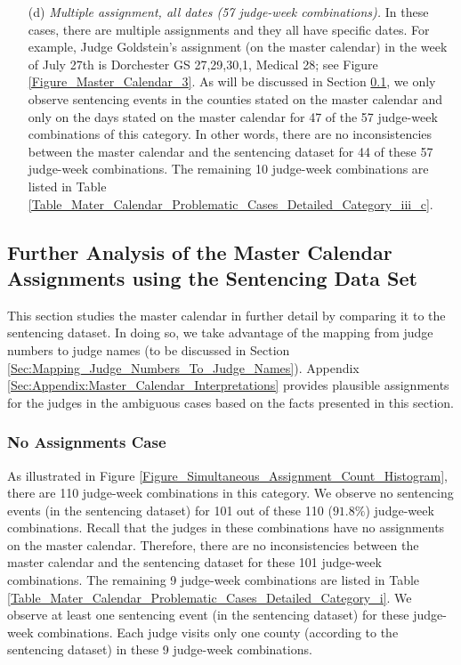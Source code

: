 \documentclass[11pt, oneside]{article}   	%
\theoremstyle{ModifiedStyle}
\begin{document}
\begin{itemize}
				\item[(d)] \emph{Multiple assignment, all dates (57 judge-week combinations).} In these cases, there are multiple assignments and they all have specific dates. For example, Judge Goldstein's assignment (on the master calendar) in the week of July 27th is Dorchester GS 27,29,30,1, Medical 28; see Figure \ref{Figure_Master_Calendar_3}. As will be discussed in Section \ref{Sec:Master_Calendar:Further_Analysis_of_Some_Assignments}, we only observe sentencing events in the counties stated on the master calendar and only on the days stated on the master calendar for 47 of the 57 judge-week combinations of this category. In other words, there are no inconsistencies between the master calendar and the sentencing dataset for 44 of these 57 judge-week combinations. The remaining 10 judge-week combinations are listed in Table \ref{Table_Mater_Calendar_Problematic_Cases_Detailed_Category_iii_c}.
			\end{itemize}

	\subsection{Further Analysis of the Master Calendar Assignments using the Sentencing Data Set}
		\label{Sec:Master_Calendar:Further_Analysis_of_Some_Assignments}

		This section studies the master calendar in further detail by comparing it to the sentencing dataset. In doing so, we take advantage of the mapping from judge numbers to judge names (to be discussed in Section \ref{Sec:Mapping_Judge_Numbers_To_Judge_Names}). Appendix \ref{Sec:Appendix:Master_Calendar_Interpretations} provides plausible assignments for the judges in the ambiguous cases based on the facts presented in this section.

		\subsubsection{No Assignments Case}
			\label{Sec:Master_Calendar:Further_Analysis_of_Some_Assignments:Category_i}
			As illustrated in Figure \ref{Figure_Simultaneous_Assignment_Count_Histogram}, there are 110 judge-week combinations in this category. We observe no sentencing events (in the sentencing dataset) for 101 out of these 110 ($91.8\%$) judge-week combinations. Recall that the judges in these combinations have no assignments on the master calendar. Therefore, there are no inconsistencies between the master calendar and the sentencing dataset for these 101 judge-week combinations. The remaining 9 judge-week combinations are listed in Table \ref{Table_Mater_Calendar_Problematic_Cases_Detailed_Category_i}. We observe at least one sentencing event (in the sentencing dataset) for these judge-week combinations. Each judge visits only one county (according to the sentencing dataset) in these 9 judge-week combinations.
\end{document}
